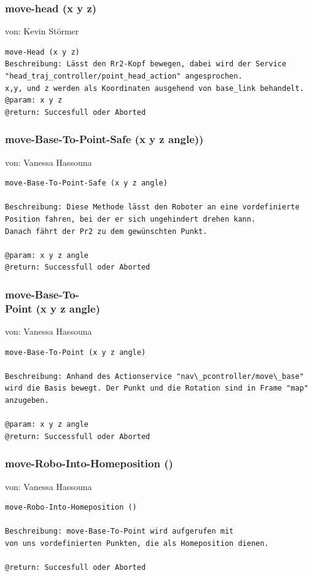 \documentclass{suturo}
\makeatletter
\newcommand{\chapterauthor}[1]{%
  {\parindent0pt\vspace*{-27pt}%
  \linespread{0}\small\begin{flushright}von: #1\end{flushright}%
  \par\nobreak\vspace*{0pt}}
  \@afterheading%
}
\makeatother
\begin{document}
\subsubsection{move-head (x y z)}
\chapterauthor{Kevin Störmer}

\begin{verbatim}
move-Head (x y z)
Beschreibung: Lässt den Rr2-Kopf bewegen, dabei wird der Service 
"head_traj_controller/point_head_action" angesprochen.
x,y, und z werden als Koordinaten ausgehend von base_link behandelt.
@param: x y z
@return: Succesfull oder Aborted
\end{verbatim}


\subsubsection{move-Base-To-Point-Safe (x y z angle))
}
\chapterauthor{Vanessa Hassouna}
\begin{verbatim}
move-Base-To-Point-Safe (x y z angle)

Beschreibung: Diese Methode lässt den Roboter an eine vordefinierte 
Position fahren, bei der er sich ungehindert drehen kann.
Danach fährt der Pr2 zu dem gewünschten Punkt.

@param: x y z angle
@return: Successfull oder Aborted
\end{verbatim}


\subsubsection{move-Base-To-\\
Point (x y z angle)}
\chapterauthor{Vanessa Hassouna}
\begin{verbatim}
move-Base-To-Point (x y z angle)

Beschreibung: Anhand des Actionservice "nav\_pcontroller/move\_base" 
wird die Basis bewegt. Der Punkt und die Rotation sind in Frame "map" anzugeben.

@param: x y z angle
@return: Successfull oder Aborted
\end{verbatim}


\subsubsection{move-Robo-Into-Homeposition ()}
\chapterauthor{Vanessa Hassouna}
\begin{verbatim}
move-Robo-Into-Homeposition ()

Beschreibung: move-Base-To-Point wird aufgerufen mit 
von uns vordefinierten Punkten, die als Homeposition dienen.

@return: Succesfull oder Aborted
\end{verbatim}
\end{document}
